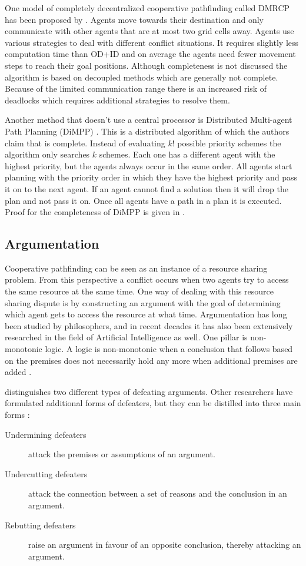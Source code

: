 One model of completely decentralized cooperative pathfinding called DMRCP has
been proposed by \citep{wei2016}. Agents move towards their destination and only
communicate with other agents that are at most two grid cells away. Agents use 
various strategies to deal with different conflict situations. It requires 
slightly less computation time than OD+ID and on average the agents need fewer 
movement steps to reach their goal positions. Although completeness is not 
discussed the algorithm is based on decoupled methods which are generally not 
complete. Because of the limited communication range there is an increased risk 
of deadlocks which requires additional strategies to resolve them.

Another method that doesn't use a central processor is Distributed Multi-agent
Path Planning (DiMPP) \citep{chouhan2017}. This is a distributed algorithm of 
which the authors claim that is complete. Instead of evaluating $k!$ possible 
priority schemes the algorithm only searches $k$ schemes. Each one has a 
different agent with the highest priority, but the agents always occur in the 
same order. All agents start planning with the priority order in which they 
have the highest priority and pass it on to the next agent. If an agent cannot 
find a solution then it will drop the plan and not pass it on. Once all agents 
have a path in a plan it is executed. Proof for the completeness of DiMPP is 
given in \cite[subsection 5.1]{chouhan2017}.

\subsection{Argumentation}
Cooperative pathfinding can be seen as an instance of a resource sharing
problem. From this perspective a conflict occurs when two agents try to access
the same resource at the same time. One way of dealing with this resource
sharing dispute is by constructing an argument with the goal of determining
which agent gets to access the resource at what time. Argumentation has long
been studied by philosophers, and in recent decades it has also been
extensively researched in the field of Artificial Intelligence as well. One 
pillar is non-monotonic logic. A logic is non-monotonic when a conclusion that 
follows based on the premises does not necessarily hold any more when 
additional premises are added \citep{vaneemeren2014,modgil2013}.

\citep{pollock1995} distinguishes two different types of defeating arguments. 
Other researchers have formulated additional forms of defeaters, but they can 
be distilled into three main forms \citep{vaneemeren2014}:
\begin{description}
	\item[Undermining defeaters] attack the premises or assumptions of an
	argument.
	\item[Undercutting defeaters] attack the connection between a set of
	reasons and the conclusion in an argument.
	\item[Rebutting defeaters] raise an argument in favour of an opposite
	conclusion, thereby attacking an argument.
\end{description}

